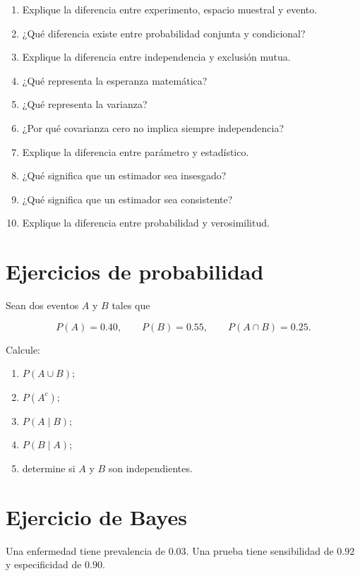 \documentclass[
  spanish,
  11pt,
  letterpaper,
  DIV=11,
  numbers=noendperiod]{scrreprt}
\providecommand{\tightlist}{%
  \setlength{\itemsep}{0pt}\setlength{\parskip}{0pt}}
\theoremstyle{definition}
\theoremstyle{plain}
\theoremstyle{definition}
\theoremstyle{remark}
\begin{document}
\begin{enumerate}
\def\labelenumi{\arabic{enumi}.}
\tightlist
\item
  Explique la diferencia entre experimento, espacio muestral y evento.
\item
  ¿Qué diferencia existe entre probabilidad conjunta y condicional?
\item
  Explique la diferencia entre independencia y exclusión mutua.
\item
  ¿Qué representa la esperanza matemática?
\item
  ¿Qué representa la varianza?
\item
  ¿Por qué covarianza cero no implica siempre independencia?
\item
  Explique la diferencia entre parámetro y estadístico.
\item
  ¿Qué significa que un estimador sea insesgado?
\item
  ¿Qué significa que un estimador sea consistente?
\item
  Explique la diferencia entre probabilidad y verosimilitud.
\end{enumerate}

\section{Ejercicios de probabilidad}\label{ejercicios-de-probabilidad}

Sean dos eventos \(A\) y \(B\) tales que

\[
P(A)=0.40,
\qquad
P(B)=0.55,
\qquad
P(A\cap B)=0.25.
\]

Calcule:

\begin{enumerate}
\def\labelenumi{\arabic{enumi}.}
\tightlist
\item
  \(P(A\cup B)\);
\item
  \(P(A^c)\);
\item
  \(P(A\mid B)\);
\item
  \(P(B\mid A)\);
\item
  determine si \(A\) y \(B\) son independientes.
\end{enumerate}

\section{Ejercicio de Bayes}\label{ejercicio-de-bayes}

Una enfermedad tiene prevalencia de \(0.03\). Una prueba tiene
sensibilidad de \(0.92\) y especificidad de \(0.90\).
\end{document}
